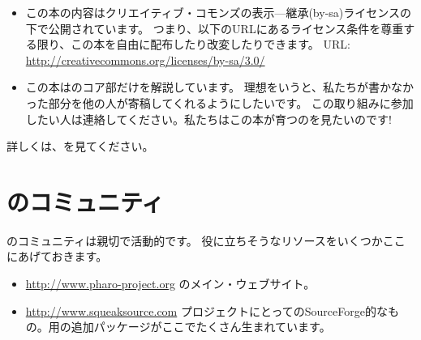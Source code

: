 \documentclass[a4paper,10pt,twoside]{book}
\begin{document}
\begin{itemize}


\item	この本の内容はクリエイティブ・コモンズの表示—継承(by-sa)ライセンスの下で公開されています。
		つまり、以下のURLにあるライセンス条件を尊重する限り、この本を自由に配布したり改変したりできます。
		URL: 
		\url{http://creativecommons.org/licenses/by-sa/3.0/}


\item	この本は\pharo のコア部だけを解説しています。
		理想をいうと、私たちが書かなかった部分を他の人が寄稿してくれるようにしたいです。
		この取り組みに参加したい人は連絡してください。私たちはこの本が育つのを見たいのです!
		
\end{itemize}

詳しくは、\pbe を見てください。


\section*{ \pharo のコミュニティ}

\pharo のコミュニティは親切で活動的です。
役に立ちそうなリソースをいくつかここにあげておきます。

\begin{itemize}
\item \url{http://www.pharo-project.org} \pharo のメイン・ウェブサイト。


\item \url{http://www.squeaksource.com} \pharo プロジェクトにとってのSourceForge的なもの。\pharo 用の追加パッケージがここでたくさん生まれています。

\end{itemize}
\end{document}
